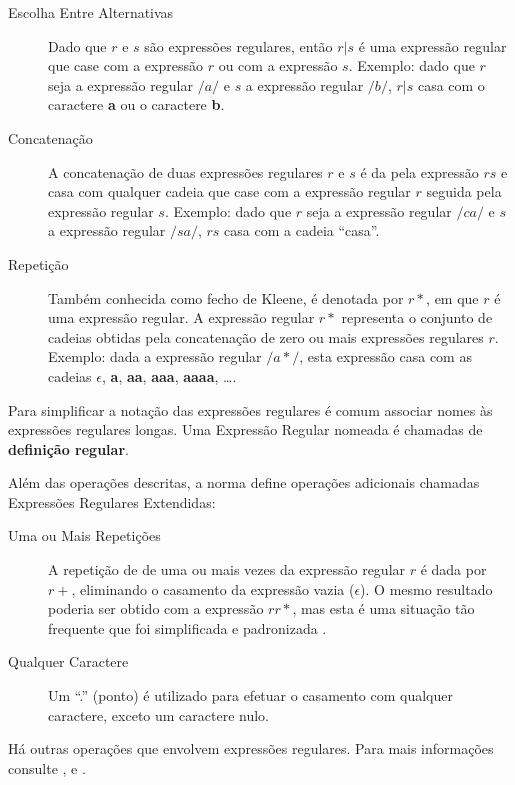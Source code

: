 \begin{description}
	\item[Escolha Entre Alternativas] Dado que $r$ e $s$ são expressões
		regulares, então $r | s$ é uma expressão regular que case com a expressão
		$r$ ou com a expressão $s$. Exemplo: dado que $r$ seja a expressão regular
		$/a/$ e $s$ a expressão regular $/b/$, $r | s$ casa com o caractere
		\textbf{a} ou o caractere \textbf{b}.
	\item[Concatenação] A concatenação de duas expressões regulares $r$ e $s$ é
		da pela expressão $rs$ e casa com qualquer cadeia que case com a expressão
		regular $r$ seguida pela expressão regular $s$. Exemplo: dado que $r$ seja
		a expressão regular $/ca/$ e $s$ a expressão regular $/sa/$, $rs$ casa
		com a cadeia ``casa''.
	\item[Repetição] Também conhecida como fecho de Kleene, é denotada por $r*$,
		em que $r$ é uma expressão regular. A expressão regular $r*$ representa o
		conjunto de cadeias obtidas pela concatenação de zero ou mais expressões
		regulares $r$. Exemplo: dada a expressão regular $/a*/$, esta expressão
		casa com as cadeias \textbf{$\epsilon$}, \textbf{a}, \textbf{aa},
		\textbf{aaa}, \textbf{aaaa}, \dots.
\end{description}

Para simplificar a notação das expressões regulares é comum associar nomes às
expressões regulares longas. Uma Expressão Regular nomeada é chamadas de
\textbf{definição regular}.

Além das operações descritas, a norma  define operações
adicionais chamadas Expressões Regulares Extendidas:

\begin{description}
	\item[Uma ou Mais Repetições] A repetição de de uma ou mais vezes da
		expressão regular $r$ é dada por $r+$, eliminando o casamento da expressão
		vazia (\(\epsilon\)). O mesmo resultado poderia ser obtido com a expressão
		$rr*$, mas esta é uma situação tão frequente que foi simplificada e
		padronizada \cite{louden97-pt}.
	\item[Qualquer Caractere] Um ``.'' (ponto) é utilizado para efetuar o
		casamento com qualquer caractere, exceto um caractere nulo.
\end{description}

Há outras operações que envolvem expressões regulares. Para mais informações
consulte ,  e
.

